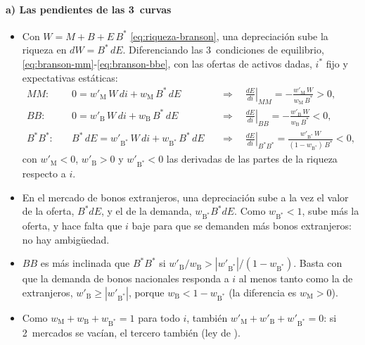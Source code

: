 \documentclass[11pt]{article}
\begin{document}
\paragraph{a) Las pendientes de las 3~curvas}
\begin{itemize}
\item Con $W=M+B+E\,B^*$ \eqref{eq:riqueza-branson}, una depreciación sube la riqueza en $dW=B^*\,dE$. Diferenciando las 3~condiciones de equilibrio, \eqref{eq:branson-mm}-\eqref{eq:branson-bbe}, con las ofertas de activos dadas, $i^*$ fijo y expectativas estáticas:
  \begin{align*}
  MM:&\quad 0=w'_{\mathrm M}\,W\,di+w_{\mathrm M}\,B^*\,dE &&\Longrightarrow\quad \left.\frac{dE}{di}\right|_{MM}=-\frac{w'_{\mathrm M}\,W}{w_{\mathrm M}\,B^*}>0,\\
  BB:&\quad 0=w'_{\mathrm B}\,W\,di+w_{\mathrm B}\,B^*\,dE &&\Longrightarrow\quad \left.\frac{dE}{di}\right|_{BB}=-\frac{w'_{\mathrm B}\,W}{w_{\mathrm B}\,B^*}<0,\\
  B^*B^*:&\quad B^*\,dE=w'_{\mathrm B^*}\,W\,di+w_{\mathrm B^*}\,B^*\,dE &&\Longrightarrow\quad \left.\frac{dE}{di}\right|_{B^*B^*}=\frac{w'_{\mathrm B^*}\,W}{(1-w_{\mathrm B^*})\,B^*}<0,
  \end{align*}
  con $w'_{\mathrm M}<0$, $w'_{\mathrm B}>0$ y $w'_{\mathrm B^*}<0$ las derivadas de las partes de la riqueza respecto a $i$.
\item En el mercado de bonos extranjeros, una depreciación sube a la vez el valor de la oferta, $B^*dE$, y el de la demanda, $w_{\mathrm B^*}B^*dE$. Como $w_{\mathrm B^*}<1$, sube más la oferta, y hace falta que $i$ baje para que se demanden más bonos extranjeros: no hay ambigüedad.
\item $BB$ es más inclinada que $B^*B^*$ si $w'_{\mathrm B}/w_{\mathrm B}>|w'_{\mathrm B^*}|/(1-w_{\mathrm B^*})$. Basta con que la demanda de bonos nacionales responda a $i$ al menos tanto como la de extranjeros, $w'_{\mathrm B}\geq|w'_{\mathrm B^*}|$, porque $w_{\mathrm B}<1-w_{\mathrm B^*}$ (la diferencia es $w_{\mathrm M}>0$).
\item Como $w_{\mathrm M}+w_{\mathrm B}+w_{\mathrm B^*}=1$ para todo $i$, también $w'_{\mathrm M}+w'_{\mathrm B}+w'_{\mathrm B^*}=0$: si 2~mercados se vacían, el tercero también (ley de ). \findemo
\end{itemize}
\end{document}
